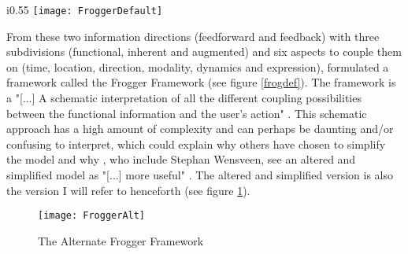 \begin{wrapfigure}{i}{0.55\textwidth}
  \texttt{[image: FroggerDefault]}
  \caption{The Frogger Framework}
  \label{frogdef}
\end{wrapfigure}

From these two information directions (feedforward and feedback) with three subdivisions (functional, inherent and augmented) and six aspects to couple them on (time, location, direction, modality, dynamics and expression),  formulated a framework called the Frogger Framework (see figure \ref{frogdef}). The framework is a "[...] A schematic interpretation of all the different coupling possibilities between the functional information and the user’s action" \cite[p. 6]{frogger}. This schematic approach has a high amount of complexity and can perhaps be daunting and/or confusing to interpret, which could explain why others have chosen to simplify the model \cite{tangifrog} and why , who include Stephan Wensveen, see an altered and simplified model as "[...] more useful" . The altered and simplified version is also the version I will refer to henceforth (see figure \ref{frogalt}).

\begin{figure}[h]
  \texttt{[image: FroggerAlt]}
  \caption{The Alternate Frogger Framework}
  \label{frogalt}
\end{figure}
